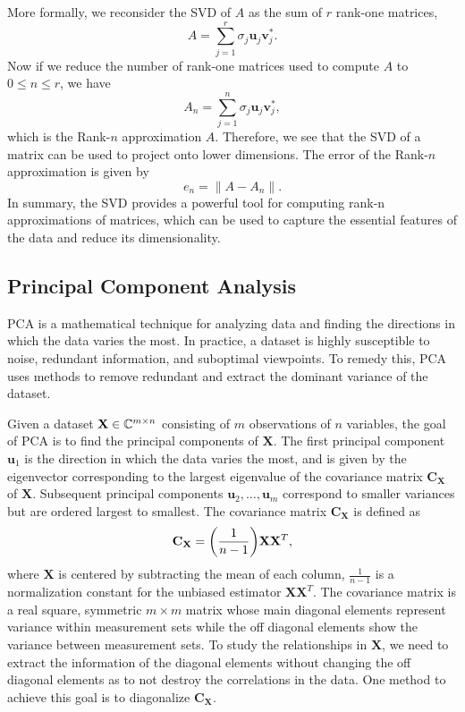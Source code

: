 \documentclass[12pt]{article}%
\begin{document}
More formally, we reconsider the SVD of $A$ as the sum of $r$ rank-one matrices,
\begin{equation}
    A = \sum_{j =1}^{r} \sigma_j \mathbf{u}_j \mathbf{v}_j^*.    
\end{equation}
Now if we reduce the number of rank-one matrices used to compute $A$ to $0 \leq n \leq r$, we have 
\begin{equation} \label{rank n}
    A_n = \sum_{j = 1}^{n} \sigma_j \mathbf{u}_j \mathbf{v}_j^*,
\end{equation}
which is the Rank-$n$ approximation $A$. Therefore, we see that the SVD of a matrix can be used to project onto lower dimensions. The error of the Rank-$n$ approximation is given by
\begin{equation}
    e_n = \|A - A_n \|. 
\end{equation} 
In summary, the SVD provides a powerful tool for computing rank-n approximations of matrices, which can be used to capture the essential features of the data and reduce its dimensionality.

\subsection{Principal Component Analysis}

PCA is a mathematical technique for analyzing data and finding the directions in which the data varies the most. In practice, a dataset is highly susceptible to noise, redundant information, and suboptimal viewpoints. To remedy this, PCA uses methods to remove redundant and extract the dominant variance of the dataset. 

Given a dataset $\mathbf{X} \in {\mathbb C}^{m \times n}$ consisting of $m$ observations of $n$ variables, the goal of PCA is to find the principal components of $\mathbf{X}$. The first principal component $\mathbf{u}_1$ is the direction in which the data varies the most, and is given by the eigenvector corresponding to the largest eigenvalue of the covariance matrix $\mathbf{C}_\mathbf{X}$ of $\mathbf{X}$. Subsequent principal components $\mathbf{u}_2, \ldots, \mathbf{u}_m$ correspond to smaller variances but are ordered largest to smallest. The covariance matrix $\mathbf{C}_\mathbf{X}$ is defined as 
\begin{equation}
    \mathbf{C}_\mathbf{X}={\left(\frac{1}{n-1}\right)}\mathbf{X}\mathbf{X}^T,
\end{equation}
where $\mathbf{X}$ is centered by subtracting the mean of each column, $\frac{1}{n-1}$ is a normalization constant for the unbiased estimator $\mathbf{X}\mathbf{X}^T$. The covariance matrix is a real square, symmetric $m \times m$ matrix whose main diagonal elements represent variance within measurement sets while the off diagonal elements show the variance between measurement sets. To study the relationships in $\mathbf{X}$, we need to extract the information of the diagonal elements without changing the off diagonal elements as to not destroy the correlations in the data. One method to achieve this goal is to diagonalize $\mathbf{C}_\mathbf{X}$.  
\end{document}
